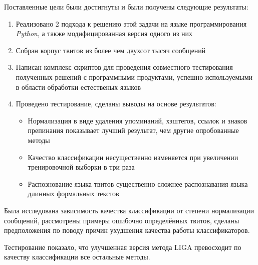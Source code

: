 \documentclass[a4paper, 14pt]{article}
\begin{document}
		Поставленные цели были достигнуты и были получены следующие результаты:
		\begin{enumerate}
			\item Реализовано 2 подхода к решению этой задачи на языке программирования \textit{Python}, а также модифицированная версия одного из них
			\item Собран корпус твитов из более чем двухсот тысяч сообщений
			\item Написан комплекс скриптов для проведения совместного тестирования полученных решений с программными продуктами, успешно используемыми в области обработки естественых языков
			\item Проведено тестирование, сделаны выводы на основе результатов:
                            \begin{itemize}
                                \item Нормализация в виде удаления упоминаний, хэштегов, ссылок и знаков препинания показывает лучший результат, чем другие опробованные методы
                                \item Качество классификации несущественно изменяется при увеличении тренировочной выборки в три раза
                                \item Распознование языка твитов существенно сложнее распознавания языка длинных формальных текстов
                            \end{itemize}
		\end{enumerate}
		Была исследована зависимость качества классификации от степени нормализации сообщений, 
		рассмотрены примеры ошибочно определённых твитов, сделаны предположения по поводу причин ухудшения качества работы классификаторов.
		
		Тестирование показало, что улучшенная версия метода LIGA превосходит по качеству классификации все остальные методы.
		
\end{document}
